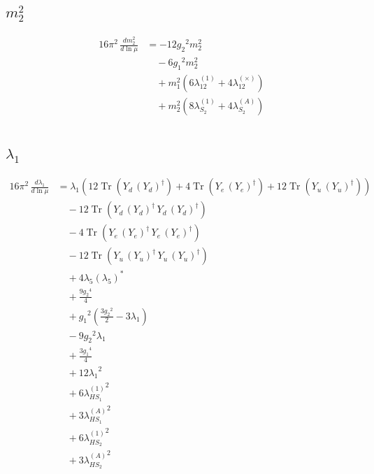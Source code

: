 \documentclass[10pt,a4paper]{article}
\begin{document}
\subsection*{$m_2^2$}
\begin{align*}
16\pi^2\,\frac{d m_2^2}{d\ln\mu} &=-12 {g_2}^2 {m_2^2} \\
&\quad -6 {g_1}^2 {m_2^2} \\
&\quad +{m_1^2} (6 {\lambda_{12}^{(1)}}+4 {\lambda_{12}^{(\times)}}) \\
&\quad +{m_2^2} (8 {\lambda_{S_2}^{(1)}}+4 {\lambda_{S_2}^{(A)}}) \\
\end{align*}
\subsection*{$\lambda_1$}
\begin{align*}
16\pi^2\,\frac{d \lambda_1}{d\ln\mu} &={\lambda_1} (12 \operatorname{Tr}\!\left({Y_d}\,\left({Y_d}\right)^{\dagger}\right)+4 \operatorname{Tr}\!\left({Y_e}\,\left({Y_e}\right)^{\dagger}\right)+12 \operatorname{Tr}\!\left({Y_u}\,\left({Y_u}\right)^{\dagger}\right)) \\
&\quad -12 \operatorname{Tr}\!\left({Y_d}\,\left({Y_d}\right)^{\dagger}\,{Y_d}\,\left({Y_d}\right)^{\dagger}\right) \\
&\quad -4 \operatorname{Tr}\!\left({Y_e}\,\left({Y_e}\right)^{\dagger}\,{Y_e}\,\left({Y_e}\right)^{\dagger}\right) \\
&\quad -12 \operatorname{Tr}\!\left({Y_u}\,\left({Y_u}\right)^{\dagger}\,{Y_u}\,\left({Y_u}\right)^{\dagger}\right) \\
&\quad +4 {\lambda_5} \left({\lambda_5}\right)^{*} \\
&\quad +\frac{9 {g_2}^4}{4} \\
&\quad +{g_1}^2 \left(\frac{3 {g_2}^2}{2}-3 {\lambda_1}\right) \\
&\quad -9 {g_2}^2 {\lambda_1} \\
&\quad +\frac{3 {g_1}^4}{4} \\
&\quad +12 {\lambda_1}^2 \\
&\quad +6 {\lambda_{HS_1}^{(1)}}^2 \\
&\quad +3 {\lambda_{HS_1}^{(A)}}^2 \\
&\quad +6 {\lambda_{HS_2}^{(1)}}^2 \\
&\quad +3 {\lambda_{HS_2}^{(A)}}^2 \\
\end{align*}
\end{document}
